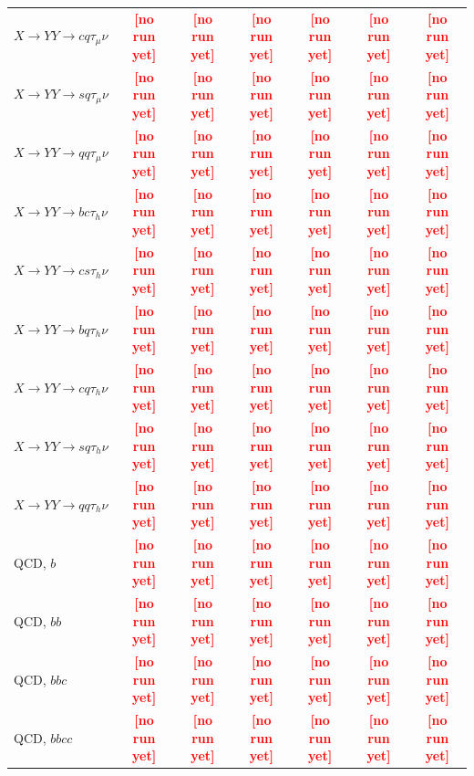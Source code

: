 \documentclass[12pt]{article}   %
\newcommand{\pending}[1]{\textcolor{red}{\textbf{[#1]}}}
\begin{document}
\begin{landscape}
{\begin{longtable}{@{\extracolsep{\fill}}lcccccc@{}}
$X\to YY\to cq\tau_\mu\nu$ & \pending{no run yet} & \pending{no run yet} & \pending{no run yet} & \pending{no run yet} & \pending{no run yet} & \pending{no run yet} \\
$X\to YY\to sq\tau_\mu\nu$ & \pending{no run yet} & \pending{no run yet} & \pending{no run yet} & \pending{no run yet} & \pending{no run yet} & \pending{no run yet} \\
$X\to YY\to qq\tau_\mu\nu$ & \pending{no run yet} & \pending{no run yet} & \pending{no run yet} & \pending{no run yet} & \pending{no run yet} & \pending{no run yet} \\
\midrule
$X\to YY\to bc\tau_h\nu$ & \pending{no run yet} & \pending{no run yet} & \pending{no run yet} & \pending{no run yet} & \pending{no run yet} & \pending{no run yet} \\
$X\to YY\to cs\tau_h\nu$ & \pending{no run yet} & \pending{no run yet} & \pending{no run yet} & \pending{no run yet} & \pending{no run yet} & \pending{no run yet} \\
$X\to YY\to bq\tau_h\nu$ & \pending{no run yet} & \pending{no run yet} & \pending{no run yet} & \pending{no run yet} & \pending{no run yet} & \pending{no run yet} \\
$X\to YY\to cq\tau_h\nu$ & \pending{no run yet} & \pending{no run yet} & \pending{no run yet} & \pending{no run yet} & \pending{no run yet} & \pending{no run yet} \\
$X\to YY\to sq\tau_h\nu$ & \pending{no run yet} & \pending{no run yet} & \pending{no run yet} & \pending{no run yet} & \pending{no run yet} & \pending{no run yet} \\
$X\to YY\to qq\tau_h\nu$ & \pending{no run yet} & \pending{no run yet} & \pending{no run yet} & \pending{no run yet} & \pending{no run yet} & \pending{no run yet} \\
\midrule
QCD, $b$ & \pending{no run yet} & \pending{no run yet} & \pending{no run yet} & \pending{no run yet} & \pending{no run yet} & \pending{no run yet} \\
QCD, $bb$ & \pending{no run yet} & \pending{no run yet} & \pending{no run yet} & \pending{no run yet} & \pending{no run yet} & \pending{no run yet} \\
QCD, $bbc$ & \pending{no run yet} & \pending{no run yet} & \pending{no run yet} & \pending{no run yet} & \pending{no run yet} & \pending{no run yet} \\
QCD, $bbcc$ & \pending{no run yet} & \pending{no run yet} & \pending{no run yet} & \pending{no run yet} & \pending{no run yet} & \pending{no run yet} \\

\end{longtable}}
\end{landscape}
\end{document}
